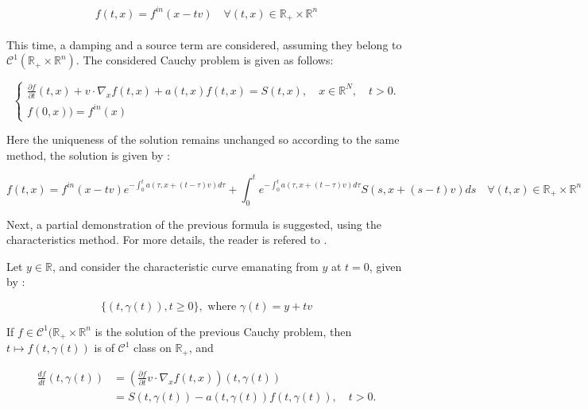 \documentclass[a4paper, 11pt]{article}
\begin{document}
\begin{equation}
f(t,x)=f^{in}(x-tv) \quad \forall (t,x) \in \mathbb{R}_+ \times \mathbb{R}^n 
\end{equation}

\paragraph{}

This time, a damping and a source term are considered, assuming they belong to $\mathcal{C}^1(\mathbb{R}_+ \times \mathbb{R}^n)$. The considered Cauchy problem is given as follows:


\[
\begin{cases}
\frac{\partial f}{\partial t}(t,x)+v \cdot \nabla_x f(t,x) + a(t,x)f(t,x) = S(t,x), \quad x \in \mathbb{R}^N, \quad t>0.\\
f(0,x)) = f^{in}(x)
\end{cases}
\]

\bigbreak

Here the uniqueness of the solution remains unchanged so according to the same method, the solution is given by : 

\begin{equation}
f(t,x)=f^{in}(x-tv) e^{-\int_0 ^t a(\tau,x+(t-\tau)v)d\tau} + \int_0 ^t  e^{-\int_0 ^t a(\tau,x+(t-\tau)v)d\tau} S(s,x+(s-t)v)ds \quad \forall (t,x) \in \mathbb{R}_+ \times \mathbb{R}^n
\end{equation}

\medbreak

Next, a partial demonstration of the previous formula is suggested, using the characteristics method. For more details, the reader is refered to \cite{allaire:2019}.

Let $y \in \mathbb{R}$, and consider the characteristic curve emanating from $y$ at $t=0$, given by :

\begin{equation}
\{(t,\gamma(t)),  t\geq 0\} , \text{ where } \gamma (t)=y+tv
\end{equation}

If $f \in \mathcal{C}^1(\mathbb{R}_+ \times \mathbb{R}^n$ is the solution of the previous Cauchy problem, then $t \mapsto f(t,\gamma(t))$ is of $\mathcal{C}^1$ class on $\mathbb{R}_+$, and 


\[
\begin{aligned}
\frac{d f}{d t}(t,\gamma(t))&=(\frac{\partial f}{\partial t}
v \cdot \nabla_x f(t,x))(t,\gamma(t)) \\ &= S(t,\gamma(t))-a(t,\gamma(t))f(t,\gamma(t)), \quad t>0.
\end{aligned}
\]
\end{document}
